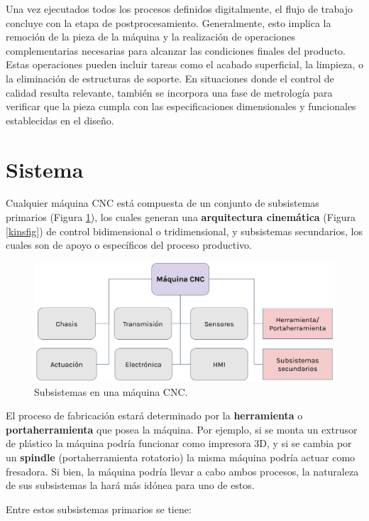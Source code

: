 Una vez ejecutados todos los procesos definidos digitalmente, el flujo de trabajo concluye con la etapa de postprocesamiento. Generalmente, esto implica la remoción de la pieza de la máquina y la realización de operaciones complementarias necesarias para alcanzar las condiciones finales del producto. Estas operaciones pueden incluir tareas como el acabado superficial, la limpieza, o la eliminación de estructuras de soporte. En situaciones donde el control de calidad resulta relevante, también se incorpora una fase de metrología para verificar que la pieza cumpla con las especificaciones dimensionales y funcionales establecidas en el diseño.

\section{Sistema}

Cualquier máquina CNC está compuesta de un conjunto de subsistemas primarios (Figura \ref{cncsis}), los cuales generan una \textbf{arquitectura cinemática} (Figura \ref{kinsfig}) de control bidimensional o tridimensional, y subsistemas secundarios, los cuales son de apoyo o específicos del proceso productivo.

\begin{figure}[h!]
    \centering
    \includegraphics[width=0.9\linewidth]{imgs/cnc.png}
    \caption{Subsistemas en una máquina CNC.}
    \label{cncsis}
\end{figure}

El proceso de fabricación estará determinado por la \textbf{herramienta} o \textbf{portaherramienta} que posea la máquina. Por ejemplo, si se monta un extrusor de plástico la máquina podría funcionar como impresora 3D, y si se cambia por un \textbf{spindle} (portaherramienta rotatorio) la misma máquina podría actuar como fresadora. Si bien, la máquina podría llevar a cabo ambos procesos, la naturaleza de sus subsistemas la hará más idónea para uno de estos.

Entre estos subsistemas primarios se tiene:

